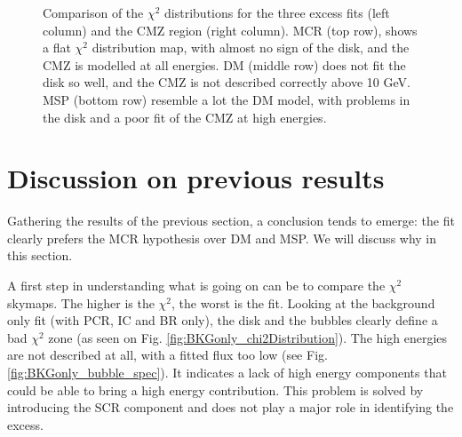 \begin{figure}[H]
\begin{minipage}[h]{0.45\textwidth}
  	\subcaption{}
  	\label{fig:MSP_only_CMZ}
  \end{minipage}
  \caption[$\chi^2$ distributions and CMZ spectra for the MCR, DM and MSP fits.]{Comparison of the $\chi^2$ distributions for the three excess fits (left column) and the CMZ region (right column). MCR (top row), shows a flat $\chi^2$ distribution map, with almost no sign of the disk, and the CMZ is modelled at all energies. DM (middle row) does not fit the disk so well, and the CMZ is not described correctly above 10 GeV. MSP (bottom row) resemble a lot the DM model, with problems in the disk and a poor fit of the CMZ at high energies.}
  \label{fig:Excess_comp_comparison}
\end{figure}



\newpage
\section{Discussion on previous results}
%

Gathering the results of the previous section, a conclusion tends to emerge: the fit clearly prefers the MCR hypothesis over DM and MSP. We will discuss why in this section.

A first step in understanding what is going on can be to compare the $\chi^2$ skymaps. The higher is the $\chi^2$, the worst is the fit. Looking at the background only fit (with PCR, IC and BR only), the disk and the bubbles clearly define a bad $\chi^2$ zone (as seen on Fig. \ref{fig:BKGonly_chi2Distribution}). The high energies are not described at all, with a fitted flux too low (see Fig. \ref{fig:BKGonly_bubble_spec}). It indicates a lack of high energy components that could be able to bring a high energy contribution. This problem is solved by introducing the SCR component and does not play a major role in identifying the excess.


